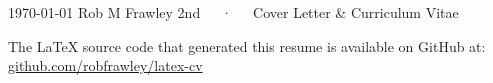%
%
%
%






\makecvheader

\makecvfooter
  {\today}
  {Rob M Frawley 2nd~~~·~~~Cover Letter \& Curriculum Vitae}
  {\thepage}



\newpage

\makecvheaderminimal





\newpage

\vspace*{\fill}

\begin{center}

\fontsize{9pt}{1.5em}\bodyfontlight\slshape\color{lighttext}

The LaTeX source code that generated this resume is available on GitHub at:\\
\color{darktext}\href{https://github.com/robfrawley/latex-cv}{github.com/robfrawley/latex-cv}

\end{center}

\vspace*{\fill}



